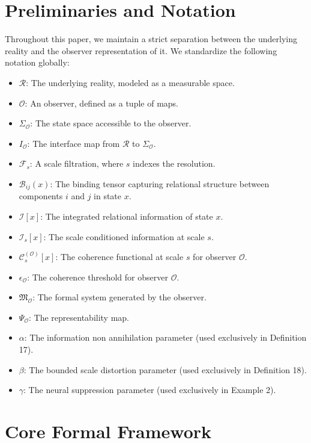 \documentclass[12pt]{article}
\theoremstyle{definition}
\begin{document}
\section{Preliminaries and Notation}

Throughout this paper, we maintain a strict separation between the underlying reality and the observer representation of it. We standardize the following notation globally:

\begin{itemize}
    \item $\mathcal{R}$: The underlying reality, modeled as a measurable space.
    \item $\mathcal{O}$: An observer, defined as a tuple of maps.
    \item $\Sigma_{\mathcal{O}}$: The state space accessible to the observer.
    \item $I_{\mathcal{O}}$: The interface map from $\mathcal{R}$ to $\Sigma_{\mathcal{O}}$.
    \item $\mathcal{F}_s$: A scale filtration, where $s$ indexes the resolution.
    \item $\mathcal{B}_{ij}(x)$: The binding tensor capturing relational structure between components $i$ and $j$ in state $x$.
    \item $\mathcal{I}[x]$: The integrated relational information of state $x$.
    \item $\mathcal{I}_s[x]$: The scale conditioned information at scale $s$.
    \item $\mathcal{C}_s^{(\mathcal{O})}[x]$: The coherence functional at scale $s$ for observer $\mathcal{O}$.
    \item $\epsilon_{\mathcal{O}}$: The coherence threshold for observer $\mathcal{O}$.
    \item $\mathfrak{M}_{\mathcal{O}}$: The formal system generated by the observer.
    \item $\Psi_{\mathcal{O}}$: The representability map.
    \item $\alpha$: The information non annihilation parameter (used exclusively in Definition 17).
    \item $\beta$: The bounded scale distortion parameter (used exclusively in Definition 18).
    \item $\gamma$: The neural suppression parameter (used exclusively in Example 2).
\end{itemize}

\section{Core Formal Framework}
\end{document}
